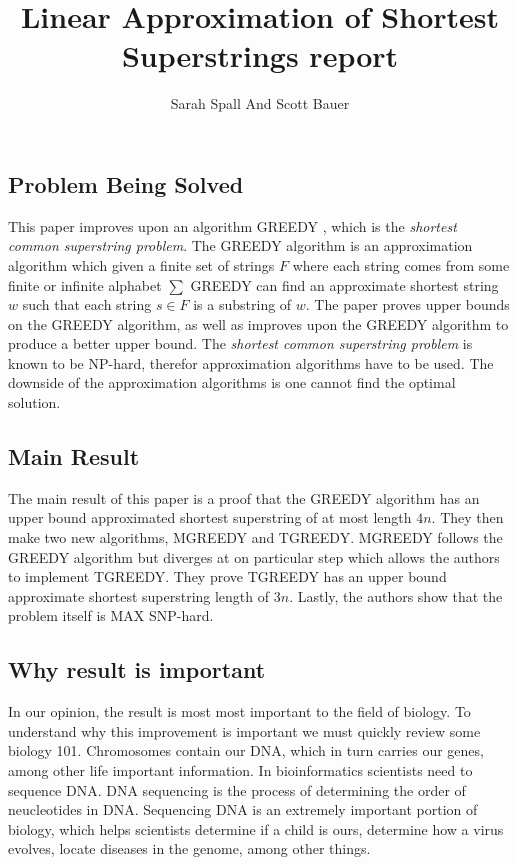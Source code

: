 \documentclass[letterpaper,11pt,titlepage]{article}
\title{Linear Approximation of Shortest Superstrings report}
\author[1]{Sarah Spall And Scott Bauer}
\begin{document}
\maketitle
\newpage


\subsection*{Problem Being Solved}

This paper improves upon an algorithm GREEDY \cite{tarhio1988greedy}, which is the \textit{shortest common superstring problem}. The GREEDY algorithm is an approximation algorithm which given a finite set of strings $F$ where each string comes from some finite or infinite alphabet $\sum$ GREEDY can find an approximate shortest string $w$ such that each string $s \in F$ is a substring of $w$. The paper proves upper bounds on the GREEDY algorithm, as well as improves upon the GREEDY algorithm to produce a better upper bound. The  \textit{shortest common superstring problem} is known to be NP-hard, therefor approximation algorithms have to be used. The downside of the approximation algorithms is one cannot find the optimal solution.  \cite{gallant1980finding}
 


\subsection*{Main Result}

The main result of this paper is a proof that the GREEDY algorithm has an upper bound approximated shortest superstring of at most length $4n$. They then make two new algorithms, MGREEDY and TGREEDY. MGREEDY follows the GREEDY algorithm but diverges at on particular step which allows the authors to implement TGREEDY. They prove TGREEDY has an upper bound approximate shortest superstring length of $3n$. Lastly, the authors show that the problem itself is MAX SNP-hard.

\subsection*{Why result is important}

In our opinion, the result is most most important to the field of biology. To understand why this improvement is important we must quickly review some biology 101. Chromosomes contain our DNA, which in turn carries our genes, among other life important information. In bioinformatics scientists need to sequence DNA. DNA sequencing is the process of determining the order of neucleotides in DNA. Sequencing DNA is an extremely important portion of biology, which helps scientists determine if a child is ours, determine how a virus evolves, locate diseases in the genome, among other things.
\end{document}

